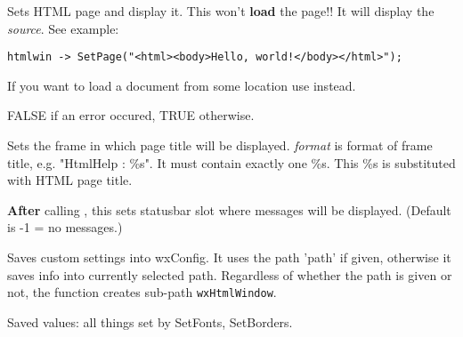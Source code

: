 Sets HTML page and display it. This won't {\bf load} the page!!
It will display the {\it source}. See example:

\begin{verbatim}
htmlwin -> SetPage("<html><body>Hello, world!</body></html>");
\end{verbatim}

If you want to load a document from some location use 
 instead.




FALSE if an error occured, TRUE otherwise.

\label{wxhtmlwindowsetrelatedframe}


Sets the frame in which page title will be displayed. {\it format} is format of
frame title, e.g. "HtmlHelp : \%s". It must contain exactly one \%s. This
\%s is substituted with HTML page title.

\label{wxhtmlwindowsetrelatedstatusbar}


{\bf After} calling ,
this sets statusbar slot where messages will be displayed.
(Default is -1 = no messages.)




\label{wxhtmlwindowwritecustomization}


Saves custom settings into wxConfig. It uses the path 'path'
if given, otherwise it saves info into currently selected path.
Regardless of whether the path is given or not, the function creates sub-path 
{\tt wxHtmlWindow}.

Saved values: all things set by SetFonts, SetBorders.





